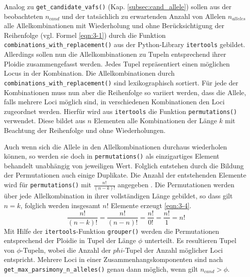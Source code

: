 Analog zu \lstinline|get_candidate_vafs()| (Kap. \ref{subsec:cand_allele}) sollen aus der beobachteten $n_{cand} $ und der tatsächlich zu erwartenden Anzahl von Allelen $n_{alleles}$ alle Allelkombinationen mit Wiederholung und ohne Berücksichtigung der Reihenfolge  (vgl. Formel \eqref{eqn:3-1}) durch die Funktion \lstinline|combinations_with_replacement()| aus der Python-Library \lstinline|itertools| gebildet. Allerdings sollen nun die Allelkombinationen zu Tupeln entsprechend ihrer Ploidie zusammengefasst werden. Jedes Tupel repräsentiert einen möglichen Locus in der Kombination. Die Allelkombinationen durch \lstinline|combinations_with_replacement()| sind lexikographisch sortiert. Für jede der Kombinationen muss nun aber die Reihenfolge so variiert werden, dass die Allele, falls mehrere Loci möglich sind, in verschiedenen Kombinationen den Loci zugeordnet werden. Hierfür wird aus \lstinline|itertools| die Funktion \lstinline|permutations()| verwendet. Diese bildet aus $ n $ Elementen alle Kombinationen der Länge $ k $ mit Beachtung der Reihenfolge und ohne Wiederholungen.

Auch wenn sich die Allele in den Allelkombinationen durchaus wiederholen können, so werden sie doch in \lstinline|permutations()| als einzigartiges Element behandelt unabhängig von jeweiligen Wert. Folglich entstehen durch die Bildung der Permutationen auch einige Duplikate. Die Anzahl der entstehenden Elemente wird für \lstinline|permutations()| mit  $ \frac{n!}{(n-k)!} $ angegeben \cite{itertools}. Die Permutationen werden über jede Allelkombination in ihrer vollständigen Länge gebildet, so dass gilt $ n = k $, folglich werden insgesamt $ n! $ Elemente erzeugt \eqref{eqn:3-4}. 
\begin{equation} \label{eqn:3-4}
\tag{3-4}
\frac{n!}{(n-k)!}=\frac{n!}{(n-n)!}=\frac{n!}{0!}=\frac{n!}{1}=n!
\end{equation}
Mit Hilfe der \lstinline|itertools|-Funktion \lstinline|grouper()| werden die Permutationen entsprechend der Ploidie in Tupel der Länge $\phi$ unterteilt. Es resultieren Tupel von $ \phi $-Tupeln, wobei die Anzahl der $phi$-Tupel der Anzahl möglicher Loci entspricht. Mehrere Loci in einer Zusammenhangskomponenten sind nach \lstinline|get_max_parsimony_n_alleles()| genau dann möglich, wenn gilt $n_{cand} > \phi $.\\

